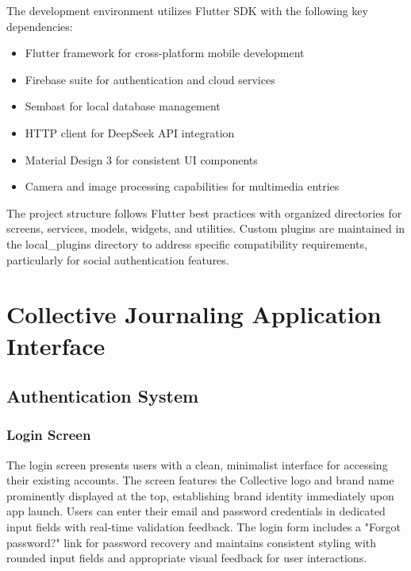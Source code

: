 The development environment utilizes Flutter SDK with the following key dependencies:
\begin{itemize}
    \item Flutter framework for cross-platform mobile development
    \item Firebase suite for authentication and cloud services
    \item Sembast for local database management
    \item HTTP client for DeepSeek API integration
    \item Material Design 3 for consistent UI components
    \item Camera and image processing capabilities for multimedia entries
\end{itemize}

The project structure follows Flutter best practices with organized directories for screens, services, models, widgets, and utilities. Custom plugins are maintained in the local\_plugins directory to address specific compatibility requirements, particularly for social authentication features.

\section{Collective Journaling Application Interface}

\subsection{Authentication System}

\subsubsection{Login Screen}

The login screen presents users with a clean, minimalist interface for accessing their existing accounts. The screen features the Collective logo and brand name prominently displayed at the top, establishing brand identity immediately upon app launch. Users can enter their email and password credentials in dedicated input fields with real-time validation feedback. The login form includes a "Forgot password?" link for password recovery and maintains consistent styling with rounded input fields and appropriate visual feedback for user interactions.


